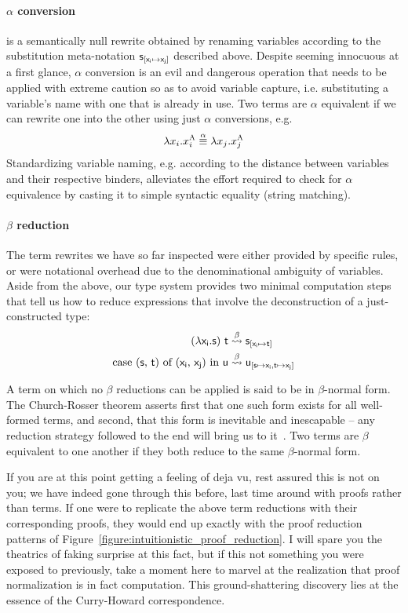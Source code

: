 \paragraph{$\alpha$ conversion} is a semantically null rewrite obtained by renaming variables according to the substitution meta-notation $\mathsf{s}_{[\mathsf{x_i} \mapsto \mathsf{x_j}]}$ described above. 
Despite seeming innocuous at a first glance, $\alpha$ conversion is an evil and dangerous operation that needs to be applied with extreme caution so as to avoid variable capture, i.e. substituting a variable's name with one that is already in use.  
Two terms are $\alpha$ equivalent if we can rewrite one into the other using just $\alpha$ conversions, e.g.
\[
	\lambda x_i.x_i^{\smallprop{A}} \overset{\alpha}{\equiv} \lambda x_j.x_j^{\smallprop{A}}
\]
Standardizing variable naming, e.g. according to the distance between variables and their respective binders, alleviates the effort required to check for $\alpha$ equivalence by casting it to simple syntactic equality (string matching).

\paragraph{$\beta$ reduction}
The term rewrites we have so far inspected were either provided by specific rules, or were notational overhead due to the denominational ambiguity of variables.
Aside from the above, our type system provides two minimal computation steps that tell us how to reduce expressions that involve the deconstruction of a just-constructed type:
\begin{align*}
(\mathsf{\lambda x_i.s})~\mathsf{t} & \overset{\beta}{\leadsto} \mathsf{s}_{[\mathsf{x_i} \mapsto \mathsf{t}]}\\
\textrm{case (\ensuremath{\mathsf{s}}, \ensuremath{\mathsf{t}}) of (\ensuremath{\mathsf{x_i}}, \ensuremath{\mathsf{x_j}}) in \ensuremath{\mathsf{u}}} & \overset{\beta}{\leadsto} \mathsf{u_{[\mathsf{s} \mapsto \mathsf{x_i}, \mathsf{t} \mapsto \mathsf{x_j}]}}
\end{align*}

A term on which no $\beta$ reductions can be applied is said to be in $\beta$-normal form.
The Church-Rosser theorem asserts first that one such form exists for all well-formed terms, and second, that this form is inevitable and inescapable -- any reduction strategy followed to the end will bring us to it~\cite{barendregt1984lambda}.
Two terms are $\beta$ equivalent to one another if they both reduce to the same $\beta$-normal form.

If you are at this point getting a feeling of deja vu, rest assured this is not on you; we have indeed gone through this before, last time around with proofs rather than terms.
If one were to replicate the above term reductions with their corresponding proofs, they would end up exactly with the proof reduction patterns of Figure~\ref{figure:intuitionistic_proof_reduction}.
I will spare you the theatrics of faking surprise at this fact, but if this not something you were exposed to previously, take a moment here to marvel at the realization that proof normalization is in fact computation.
This ground-shattering discovery lies at the essence of the Curry-Howard correspondence.

